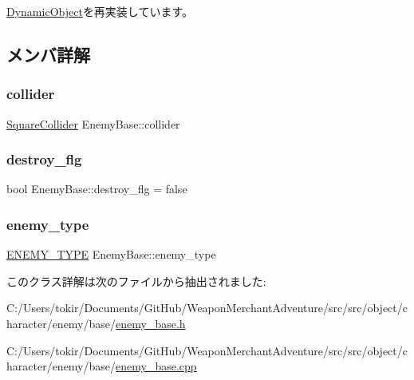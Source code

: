 \mbox{\hyperlink{class_dynamic_object_aa7488e1b4dfd7049447535d93d9d6783}{Dynamic\+Object}}を再実装しています。



\subsection{メンバ詳解}
\mbox{\label{class_enemy_base_aea91f1e50b8977daa467a3d9fe5f0ef9}} 
\subsubsection{\texorpdfstring{collider}{collider}}
{\footnotesize\ttfamily \mbox{\hyperlink{class_square_collider}{Square\+Collider}} Enemy\+Base\+::collider\hspace{0.3cm}{\ttfamily [protected]}}

\mbox{\label{class_enemy_base_a0ea15efab9eed801fb676b9276c8e9c9}} 
\subsubsection{\texorpdfstring{destroy\+\_\+flg}{destroy\_flg}}
{\footnotesize\ttfamily bool Enemy\+Base\+::destroy\+\_\+flg = false\hspace{0.3cm}{\ttfamily [protected]}}

\mbox{\label{class_enemy_base_a34ad22e6b0d06b8d63c207c843383eba}} 
\subsubsection{\texorpdfstring{enemy\+\_\+type}{enemy\_type}}
{\footnotesize\ttfamily \mbox{\hyperlink{enemy__base_8h_aef73e23ea1cdc9dda520bbb81af707db}{E\+N\+E\+M\+Y\+\_\+\+T\+Y\+PE}} Enemy\+Base\+::enemy\+\_\+type}



このクラス詳解は次のファイルから抽出されました\+:\begin{DoxyCompactItemize}
\item 
C\+:/\+Users/tokir/\+Documents/\+Git\+Hub/\+Weapon\+Merchant\+Adventure/src/src/object/character/enemy/base/\mbox{\hyperlink{enemy__base_8h}{enemy\+\_\+base.\+h}}\item 
C\+:/\+Users/tokir/\+Documents/\+Git\+Hub/\+Weapon\+Merchant\+Adventure/src/src/object/character/enemy/base/\mbox{\hyperlink{enemy__base_8cpp}{enemy\+\_\+base.\+cpp}}\end{DoxyCompactItemize}
